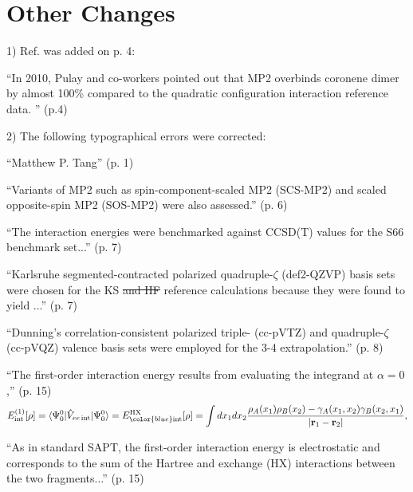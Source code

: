 \documentclass[journal=jctcce,manuscript=article]{achemso}
\newcommand*{\rev}[1]{{\color{blue} #1}}
\begin{document}
\section*{Other Changes}

\hspace{0.5cm}1) Ref.  was added on p. 4:

``In 2010, Pulay and co-workers pointed out that MP2 overbinds
  coronene dimer by almost 100\% compared to the quadratic configuration
  interaction reference
  data.\cite{doi:10.1080/00268970903397249}\rev{\cite{doi:10.1007/s00214-011-1009-6}}''
  (p.4)

2) The following typographical errors were corrected:
  
``Matthew \rev{P.} Tang'' (p. 1)

``Variants of MP2 such as spin-component-scaled MP2 (SCS-MP2)\cite{Grimme03JChemPhys118p9095}
and \rev{scaled opposite-spin} MP2 (SOS-MP2)\cite{doi:10.1063/1.1809602} were
also assessed.'' (p. 6)

``The interaction energies were benchmarked against CCSD(T) values
  for the S66 benchmark \rev{set\cite{doi:10.1021/ct2002946,doi:10.1021/ct200523a}}...''
  (p. 7)

``Karlsruhe segmented-contracted polarized quadruple-$\zeta$ (def2-QZVP)
  basis sets\cite{Weigend05PhysChemChemPhys7p3297,Weigend03JChemPhys119p12753}
  were chosen for the KS \rev{\sout{and HF}} reference calculations because they were
  found to yield ...'' (p. 7)

``Dunning's correlation-consistent polarized triple- (cc-pVTZ) and
  quadruple-$\zeta$ \rev{(cc-pVQZ)} valence basis
  sets\cite{Dunning89JChemPhys90p1007,doi:10.1063/1.464303} were employed for
  the 3-4 extrapolation.'' (p. 8)

``The first-order interaction energy results from evaluating the integrand
at $\alpha=0$,'' (p. 15) 
\begin{equation}
  E_{\text{int}}^{(1)}[\rho] = \braket{ \Psi^0_0 |
    \hat{V}_{ee \,\text{int}} | \Psi^0_0 } = E^{\text{HX}}_{\rev{\text{int}}}[\rho] = 
  \int dx_1 dx_2 \frac{ \rho_A(x_1)
    \rho_B(x_2) - \gamma_A(x_1,x_2)\gamma_B(x_2,x_1) }{|\mathbf{r}_1-\mathbf{r}_2|},
\end{equation}

``As in standard SAPT, the first-order interaction energy is electrostatic
and corresponds to the sum of the Hartree and exchange \rev{(HX)} interactions
between the two fragments...'' (p. 15)
\end{document}
